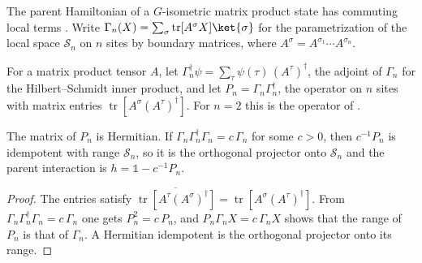 The parent Hamiltonian of a $G$-isometric matrix product state has commuting
local terms \cite[Section~``Commuting parent Hamiltonians'']{Schuch2010PEPS}.
Write $\Gamma_{n}(X)=\sum_{\sigma}\operatorname{tr}[A^{\sigma}X]\ket{\sigma}$ for
the parametrization of the local space $\mathcal{S}_{n}$ on $n$ sites by
boundary matrices, where $A^{\sigma}=A^{\sigma_{1}}\cdots A^{\sigma_{n}}$.

\begin{definition}%
    \label{def:peps_ground_space_frame}
    \leanok
    For a matrix product tensor $A$, let
    $\Gamma_{n}^{\dagger}\psi=\sum_{\tau}\psi(\tau)\,(A^{\tau})^{\dagger}$, the
    adjoint of $\Gamma_{n}$ for the Hilbert--Schmidt inner product, and let
    $P_{n}=\Gamma_{n}\Gamma_{n}^{\dagger}$, the operator on $n$ sites with matrix
    entries $\operatorname{tr}[A^{\sigma}(A^{\tau})^{\dagger}]$. For $n=2$ this is
    the operator of \cite[Lemma~6.11]{Schuch2010PEPS}.
\end{definition}

\begin{lemma}%
    \label{thm:peps_ground_space_frame_projector}
    \leanok
    The matrix of $P_{n}$ is Hermitian. If
    $\Gamma_{n}\Gamma_{n}^{\dagger}\Gamma_{n}=c\,\Gamma_{n}$ for some $c>0$, then
    $c^{-1}P_{n}$ is idempotent with range $\mathcal{S}_{n}$, so it is the
    orthogonal projector onto $\mathcal{S}_{n}$ and the parent interaction is
    $h=\mathbb{1}-c^{-1}P_{n}$.
\end{lemma}

\begin{proof}\leanok
    The entries satisfy
    $\overline{\operatorname{tr}[A^{\tau}(A^{\sigma})^{\dagger}]}
        =\operatorname{tr}[A^{\sigma}(A^{\tau})^{\dagger}]$. From
    $\Gamma_{n}\Gamma_{n}^{\dagger}\Gamma_{n}=c\,\Gamma_{n}$ one gets
    $P_{n}^{2}=c\,P_{n}$, and $P_{n}\Gamma_{n}X=c\,\Gamma_{n}X$ shows that the
    range of $P_{n}$ is that of $\Gamma_{n}$. A Hermitian idempotent is the
    orthogonal projector onto its range.
\end{proof}

